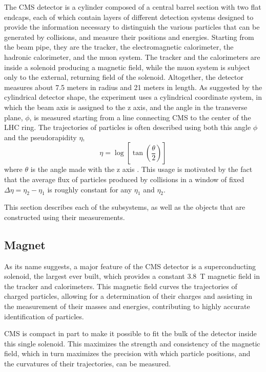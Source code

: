   The CMS detector is a cylinder composed of a central barrel section with two flat endcaps, each of which contain layers of different detection systems designed to provide the information necessary to distinguish the various particles that can be generated by collisions, and measure their positions and energies.
  Starting from the beam pipe, they are the tracker, the electromagnetic calorimeter, the hadronic calorimeter, and the muon system.
  The tracker and the calorimeters are inside a solenoid producing a magnetic field, while the muon system is subject only to the external, returning field of the solenoid.
  Altogether, the detector measures about 7.5 meters in radius and 21 meters in length.
  As suggested by the cylindrical detector shape, the experiment uses a cylindrical coordinate system, in which the beam axis is assigned to the z axis, and the angle in the transverse plane, $\phi$, is measured starting from a line connecting CMS to the center of the LHC ring.
  The trajectories of particles is often described using both this angle $\phi$ and the pseudorapidity $\eta$, 
  \begin{equation} \label{eqn:eta}
    \eta = \log\left[\tan\left(\frac{\theta}{2}\right)\right]
  \end{equation}
  where $\theta$ is the angle made with the z axis \cite{cmstdr}.
  This usage is motivated by the fact that the average flux of particles produced by collisions in a window of fixed $\Delta\eta=\eta_2-\eta_1$ is roughly constant for any $\eta_1$ and $\eta_2$.

  This section describes each of the subsystems, as well as the objects that are constructed using their measurements.

  \subsection{Magnet} \label{sec:magnet}

  As its name suggests, a major feature of the CMS detector is a superconducting solenoid, the largest ever built, which provides a constant 3.8~T magnetic field in the tracker and calorimeters.
  This magnetic field curves the trajectories of charged particles, allowing for a determination of their charges and assisting in the measurement of their masses and energies, contributing to highly accurate identification of particles.
  
  CMS is compact in part to make it possible to fit the bulk of the detector inside this single solenoid.
  This maximizes the strength and consistency of the magnetic field, which in turn maximizes the precision with which particle positions, and the curvatures of their trajectories, can be measured.

